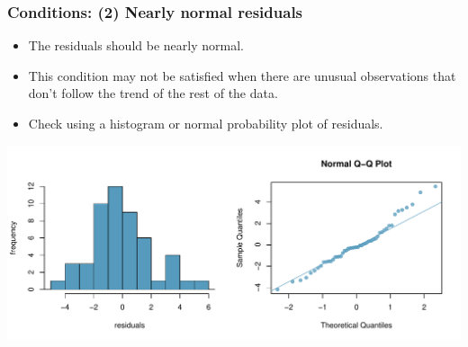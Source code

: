 
\begin{frame}
\frametitle{Conditions: (2) Nearly normal residuals}

\begin{itemize}

\item The residuals should be nearly normal.

\pause

\item This condition may not be satisfied when there are unusual observations that don't follow the trend of the rest of the data.

\pause

\item Check using a histogram or normal probability plot of residuals.

\end{itemize}

\begin{center}
\includegraphics[width=\textwidth]{7-2_least_square_reg/figures/poverty/normal_res}
\end{center}

\end{frame}


